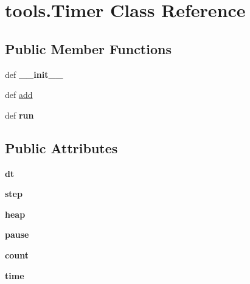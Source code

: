 \hypertarget{classtools_1_1_timer}{\section{tools.\-Timer \-Class \-Reference}
\label{classtools_1_1_timer}
}
\subsection*{\-Public \-Member \-Functions}
\begin{DoxyCompactItemize}
\item 
\hypertarget{classtools_1_1_timer_aa8eb0f7637ab77b3558633a24267ec12}{def {\bfseries \-\_\-\-\_\-init\-\_\-\-\_\-}}\label{classtools_1_1_timer_aa8eb0f7637ab77b3558633a24267ec12}

\item 
def \hyperlink{classtools_1_1_timer_a5f2a146060a63948098337885132c3cf}{add}
\item 
\hypertarget{classtools_1_1_timer_ae3470afe22648a6bc6cd7104bb3fc4e2}{def {\bfseries run}}\label{classtools_1_1_timer_ae3470afe22648a6bc6cd7104bb3fc4e2}

\end{DoxyCompactItemize}
\subsection*{\-Public \-Attributes}
\begin{DoxyCompactItemize}
\item 
\hypertarget{classtools_1_1_timer_a4979bfdbf6635ea450ecefd1f3db623a}{{\bfseries dt}}\label{classtools_1_1_timer_a4979bfdbf6635ea450ecefd1f3db623a}

\item 
\hypertarget{classtools_1_1_timer_a893d0a9a5e7d031b0f1af5efc5743cc8}{{\bfseries step}}\label{classtools_1_1_timer_a893d0a9a5e7d031b0f1af5efc5743cc8}

\item 
\hypertarget{classtools_1_1_timer_a3023e0d71d6badac61bc599dcfd1eb8c}{{\bfseries heap}}\label{classtools_1_1_timer_a3023e0d71d6badac61bc599dcfd1eb8c}

\item 
\hypertarget{classtools_1_1_timer_ad498ee353df48ed8e3e018e0ed61bea4}{{\bfseries pause}}\label{classtools_1_1_timer_ad498ee353df48ed8e3e018e0ed61bea4}

\item 
\hypertarget{classtools_1_1_timer_a3b500aad25a782ff35fdc0a0c08b92ed}{{\bfseries count}}\label{classtools_1_1_timer_a3b500aad25a782ff35fdc0a0c08b92ed}

\item 
\hypertarget{classtools_1_1_timer_a57e5a80add7f6e9cbebefae90b737e04}{{\bfseries time}}\label{classtools_1_1_timer_a57e5a80add7f6e9cbebefae90b737e04}

\end{DoxyCompactItemize}


